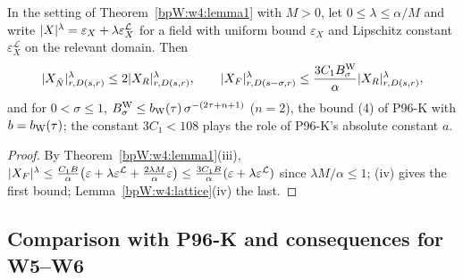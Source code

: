 \begin{corollary}[P96-K Lemma~2]\label{bpW:w4:lemma2}
In the setting of Theorem~\ref{bpW:w4:lemma1} with $M>0$, let $0\le\lambda\le\alpha/M$ and write
$\lvert X\rvert^\lambda=\varepsilon_X+\lambda\varepsilon_X^{\mathcal L}$ for a field with uniform bound $\varepsilon_X$ and Lipschitz
constant $\varepsilon_X^{\mathcal L}$ on the relevant domain. Then
\[\lvert X_{\hat N}\rvert^\lambda_{r,D(s,r)}\le2\lvert X_R\rvert^\lambda_{r,D(s,r)},\qquad
\lvert X_F\rvert^\lambda_{r,D(s-\sigma,r)}\le\frac{3C_1B^{\rm W}_\sigma}{\alpha}\lvert X_R\rvert^\lambda_{r,D(s,r)},\]
and for $0<\sigma\le1$, $B^{\rm W}_\sigma\le b_{\rm W}(\tau)\,\sigma^{-(2\tau+n+1)}$ ($n=2$), the bound (4) of P96-K with
$b=b_{\rm W}(\tau)$; the constant $3C_1<108$ plays the role of P96-K's absolute constant $a$.
\end{corollary}

\begin{proof}
By Theorem~\ref{bpW:w4:lemma1}(iii),
$\lvert X_F\rvert^\lambda\le\frac{C_1B}\alpha\bigl(\varepsilon+\lambda\varepsilon^{\mathcal L}+\frac{2\lambda M}\alpha\varepsilon\bigr)\le\frac{3C_1B}\alpha(\varepsilon+\lambda\varepsilon^{\mathcal L})$
since $\lambda M/\alpha\le1$; (iv) gives the first bound; Lemma~\ref{bpW:w4:lattice}(iv) the last.
\end{proof}

\subsection{Comparison with P96-K and consequences for W5--W6}\label{bpW:w4:compare-sec}

